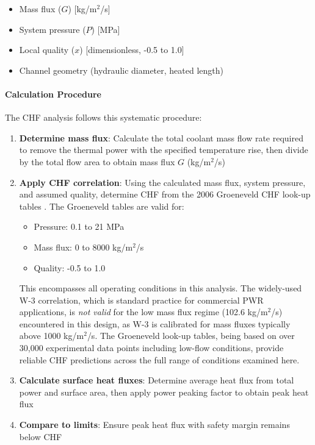 \begin{itemize}
    \item Mass flux ($G$) [kg/m$^2$/s]
    \item System pressure ($P$) [MPa]
    \item Local quality ($x$) [dimensionless, -0.5 to 1.0]
    \item Channel geometry (hydraulic diameter, heated length)
\end{itemize}

\paragraph{Calculation Procedure}

The CHF analysis follows this systematic procedure:

\begin{enumerate}
    \item \textbf{Determine mass flux}: Calculate the total coolant mass flow rate required to remove the thermal power with the specified temperature rise, then divide by the total flow area to obtain mass flux $G$ (kg/m$^2$/s)
    
    \item \textbf{Apply CHF correlation}: Using the calculated mass flux, system pressure, and assumed quality, determine CHF from the 2006 Groeneveld CHF look-up tables \cite{Groeneveld2007TheTable}. The Groeneveld tables are valid for:
    \begin{itemize}
        \item Pressure: 0.1 to 21 MPa
        \item Mass flux: 0 to 8000 kg/m$^2$/s
        \item Quality: -0.5 to 1.0
    \end{itemize}
    
    This encompasses all operating conditions in this analysis. The widely-used W-3 correlation, which is standard practice for commercial PWR applications, is \textit{not valid} for the low mass flux regime (102.6 kg/m$^2$/s) encountered in this design, as W-3 is calibrated for mass fluxes typically above 1000 kg/m$^2$/s. The Groeneveld look-up tables, being based on over 30,000 experimental data points including low-flow conditions, provide reliable CHF predictions across the full range of conditions examined here.
    
    \item \textbf{Calculate surface heat fluxes}: Determine average heat flux from total power and surface area, then apply power peaking factor to obtain peak heat flux
    
    \item \textbf{Compare to limits}: Ensure peak heat flux with safety margin remains below CHF
\end{enumerate}


